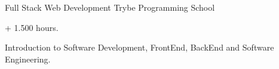 

\begin{cventries}

\cventry
    {Full Stack Web Development} %
    {Trybe} %
    {Programming School} %
    {} %
    {
      \begin{cvitems} %
      \item {+ 1.500 hours.}
      \item {Introduction to Software Development, FrontEnd, BackEnd and Software Engineering.}
      \end{cvitems}
    }

\end{cventries}
